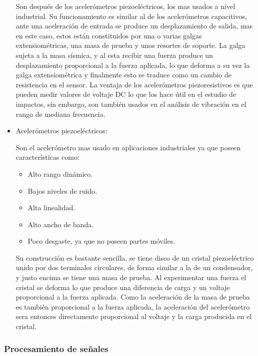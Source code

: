 \begin{itemize}
        Son después de los acelerómetros piezoeléctricos, los mas usados a nivel
        industrial. Su funcionamiento es similar al de los acelerómetros
        capacitivos, ante una aceleración de entrada se produce un desplazamiento
        de salida, mas en este caso, estos están constituidos por una o varias
        galgas extensiométricas, una masa de prueba y unos resortes de soporte.
        La galga sujeta a la masa sísmica, y al esta recibir una fuerza produce
        un desplazamiento proporcional a la fuerza aplicada, lo que deforma a
        su vez la galga extensiométrica y finalmente esto se traduce como un
        cambio de resistencia en el sensor. La ventaja de los acelerómetros
        piezoresistivos es que pueden medir valores de voltaje DC lo que los
        hace útil en el estudio de impactos, sin embargo, son también usados en el
        análisis de vibración en el rango de mediana frecuencia.


    \item Acelerómetros piezoeléctricos:

        Son el acelerómetro mas usado en aplicaciones industriales ya que
        poseen características como:

        \begin{itemize}
            \item Alto rango dinámico.
            \item Bajos niveles de ruido.
            \item Alta linealidad.
            \item Alto ancho de banda.
            \item Poco desgaste, ya que no poseen partes móviles.
        \end{itemize}


        Su construcción es bastante sencilla, se tiene disco de un cristal
        piezoeléctrico unido por dos terminales circulares, de forma similar a
        la de un condensador, y justo encima se tiene una masa de prueba.
        Al experimentar una fuerza el cristal se deforma lo que produce una
        diferencia de carga y un voltaje proporcional a la fuerza aplicada.
        Como la aceleración de la masa de prueba es también proporcional a la
        fuerza aplicada, la aceleración del acelerómetro sera entonces
        directamente proporcional al voltaje y la carga producida en el cristal.

\end{itemize}


\subsubsection{Procesamiento de señales}

